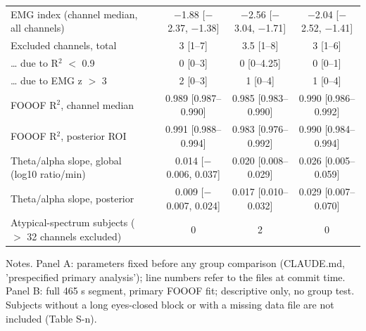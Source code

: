 \begin{table}[htbp]
{\begin{tabular}{p{3.2cm}p{6.5cm}ccc}
EMG index (channel median, all channels) &  & $-$1.88 [$-$2.37, $-$1.38] & $-$2.56 [$-$3.04, $-$1.71] & $-$2.04 [$-$2.52, $-$1.41] \\
Excluded channels, total &  & 3 [1--7] & 3.5 [1--8] & 3 [1--6] \\
\ldots{} due to R$^{2}$ $<$ 0.9 &  & 0 [0--3] & 0 [0--4.25] & 0 [0--1] \\
\ldots{} due to EMG z $>$ 3 &  & 2 [0--3] & 1 [0--4] & 1 [0--4] \\
FOOOF R$^{2}$, channel median &  & 0.989 [0.987--0.990] & 0.985 [0.983--0.990] & 0.990 [0.986--0.992] \\
FOOOF R$^{2}$, posterior ROI &  & 0.991 [0.988--0.994] & 0.983 [0.976--0.992] & 0.990 [0.984--0.994] \\
Theta/alpha slope, global (log10 ratio/min) &  & 0.014 [$-$0.006, 0.037] & 0.020 [0.008--0.029] & 0.026 [0.005--0.059] \\
Theta/alpha slope, posterior &  & 0.009 [$-$0.007, 0.024] & 0.017 [0.010--0.032] & 0.029 [0.007--0.070] \\
Atypical-spectrum subjects ($>$ 32 channels excluded) &  & 0 & 2 & 0 \\
\bottomrule
\end{tabular}
}
\par\smallskip
\begin{minipage}{\textwidth}\raggedright\scriptsize
Notes. Panel A: parameters fixed before any group comparison (CLAUDE.md, 'prespecified primary analysis'); line numbers refer to the files at commit time. Panel B: full 465 s segment, primary FOOOF fit; descriptive only, no group test. Subjects without a long eyes-closed block or with a missing data file are not included (Table S-n).
\end{minipage}
\end{table}
